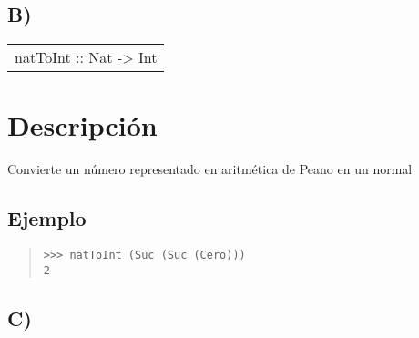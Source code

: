 \subsection{B)}
\begin{haddockdesc}
\item[\begin{tabular}{@{}l}
natToInt :: Nat -> Int
\end{tabular}]
{\haddockbegindoc
\section*{Descripción}
Convierte un número representado en aritmética de Peano en un  normal\par
\subsection*{Ejemplo}
\begin{quote}
{\haddockverb\begin{verbatim}
>>> natToInt (Suc (Suc (Cero)))
2

\end{verbatim}}
\end{quote}}
\end{haddockdesc}
\subsection{C)}
